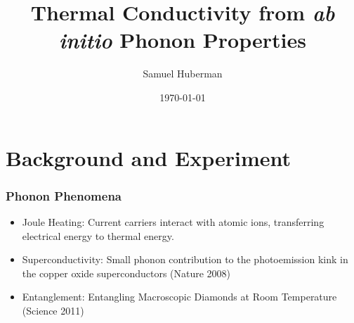 \documentclass[]{beamer}
\title{Thermal Conductivity from \textit{ab initio} Phonon Properties}    %
\author{Samuel Huberman}                 %
\institute{ECE 1336}      %
\date{\today}                    %
\begin{document}

\begin{frame}
  \titlepage
\end{frame}

\section[Outline]{}

\begin{frame}
  \tableofcontents
\end{frame}


\section{Background and Experiment}
\begin{frame}
  \frametitle{Phonon Phenomena}   %

  \begin{itemize}
  \item Joule Heating: Current carriers interact with atomic ions, transferring electrical energy to thermal energy.
  \item Superconductivity: Small phonon contribution to the photoemission kink in the copper oxide superconductors (Nature 2008)
  \item Entanglement: Entangling Macroscopic Diamonds at Room Temperature (Science 2011)
  \end{itemize} 
\end{frame}
\end{document}
